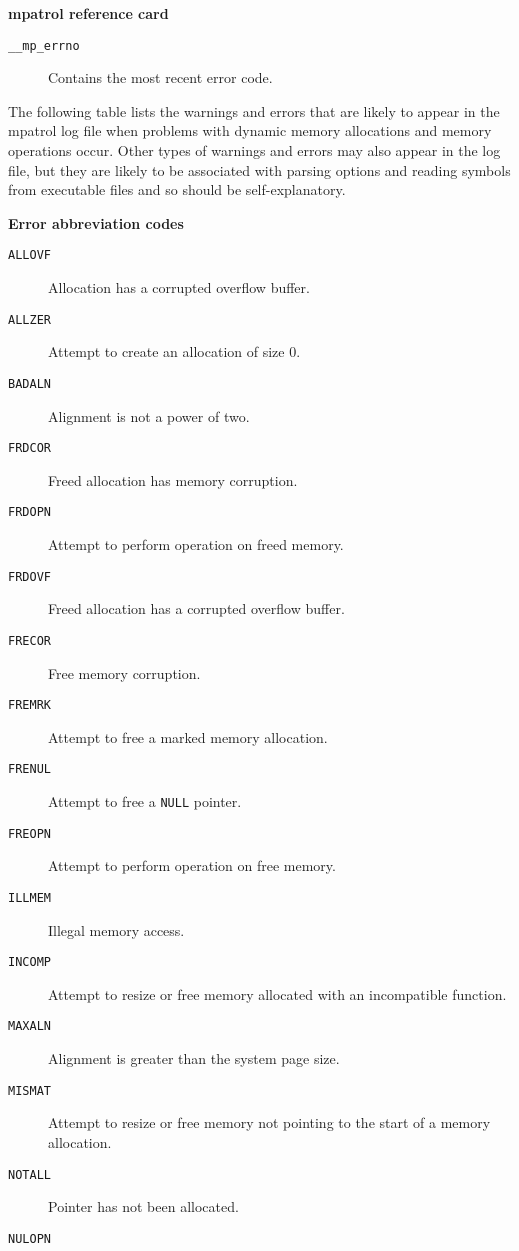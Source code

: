 \documentclass[a4paper,landscape,final]{article}
\newcommand{\heading}[1]{\textbf{\normalsize #1}}
\newcommand{\variable}[1]{\texttt{#1}}
\newcommand{\error}[1]{\texttt{#1}}
\begin{document}
\begin{multicols}{3}{\textbf{\Large mpatrol reference card}}
\begin{description}
\item[\variable{\_\_mp\_errno}]
\hfill Contains the most recent error code.
\end{description}

\vskip 12pt

The following table lists the warnings and errors that are likely to appear in
the mpatrol log file when problems with dynamic memory allocations and memory
operations occur.  Other types of warnings and errors may also appear in the log
file, but they are likely to be associated with parsing options and reading
symbols from executable files and so should be self-explanatory.

\vskip 12pt
\heading{Error abbreviation codes}
\vskip 6pt

\begin{description}
\item[\error{ALLOVF}]
\hfill Allocation has a corrupted overflow buffer.
\item[\error{ALLZER}]
\hfill Attempt to create an allocation of size 0.
\item[\error{BADALN}]
\hfill Alignment is not a power of two.
\item[\error{FRDCOR}]
\hfill Freed allocation has memory corruption.
\item[\error{FRDOPN}]
\hfill Attempt to perform operation on freed memory.
\item[\error{FRDOVF}]
\hfill Freed allocation has a corrupted overflow buffer.
\item[\error{FRECOR}]
\hfill Free memory corruption.
\item[\error{FREMRK}]
\hfill Attempt to free a marked memory allocation.
\item[\error{FRENUL}]
\hfill Attempt to free a \texttt{NULL} pointer.
\item[\error{FREOPN}]
\hfill Attempt to perform operation on free memory.
\item[\error{ILLMEM}]
\hfill Illegal memory access.
\item[\error{INCOMP}]
Attempt to resize or free memory allocated with an incompatible function.
\item[\error{MAXALN}]
\hfill Alignment is greater than the system page size.
\item[\error{MISMAT}]
Attempt to resize or free memory not pointing to the start of a memory
allocation.
\item[\error{NOTALL}]
\hfill Pointer has not been allocated.
\item[\error{NULOPN}]

\end{description}
\end{multicols}
\end{document}
